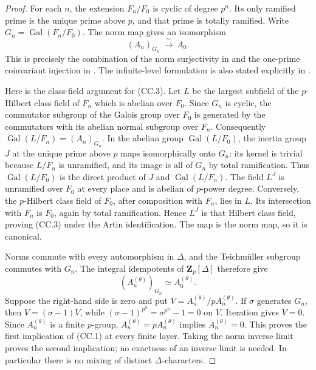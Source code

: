 \begin{proof}
For each $n$, the extension $F_n/F_0$ is cyclic of degree $p^n$.
Its only ramified prime is the unique prime above $p$, and that
prime is totally ramified. Write $G_n=\operatorname{Gal}(F_n/F_0)$.
The norm map gives an isomorphism
\[
                 (A_n)_{G_n}\ \xrightarrow{\ \sim\ }\ A_0.
 \tag{CC.3}
\]
This is precisely the combination of the norm surjectivity in
\cite[Corollary~1.3.9, p.~17]{SharifiIwasawaFull2026} and the
one-prime coinvariant injection in
\cite[Corollary~1.3.12, p.~18]{SharifiIwasawaFull2026}.
The infinite-level formulation is also stated explicitly in
\cite[Proposition~3.2.11, equation~(3.2.1), pp.~80--81;
Remark~3.2.12, p.~81]{SharifiIwasawaFull2026}.

Here is the class-field argument for (CC.3). Let $L$ be the largest
subfield of the $p$-Hilbert class field of $F_n$ which is abelian
over $F_0$. Since $G_n$ is cyclic, the commutator subgroup of the
Galois group over $F_0$ is generated by the commutators with its
abelian normal subgroup over $F_n$. Consequently
$\operatorname{Gal}(L/F_n)=(A_n)_{G_n}$.
In the abelian group $\operatorname{Gal}(L/F_0)$, the inertia
group $J$ at the unique prime above $p$ maps isomorphically onto
$G_n$: its kernel is trivial because $L/F_n$ is unramified, and
its image is all of $G_n$ by total ramification. Thus
$\operatorname{Gal}(L/F_0)$ is the direct product of $J$ and
$\operatorname{Gal}(L/F_n)$. The field $L^J$ is unramified over
$F_0$ at every place and is abelian of $p$-power degree. Conversely,
the $p$-Hilbert class field of $F_0$, after composition with $F_n$,
lies in $L$. Its intersection with $F_n$ is $F_0$, again by total
ramification. Hence $L^J$ is that Hilbert class field, proving
(CC.3) under the Artin identification. The map is the norm map,
so it is canonical.

Norms commute with every automorphism in $\Delta$, and the
Teichm\"uller subgroup commutes with $G_n$. The integral
idempotents of $\mathbf Z_p[\Delta]$ therefore give
\[
 (A_n^{(\theta)})_{G_n}\simeq A_0^{(\theta)}.
\]
Suppose the right-hand side is zero and put
$V=A_n^{(\theta)}/pA_n^{(\theta)}$. If $\sigma$ generates $G_n$,
then $V=(\sigma-1)V$, while
$(\sigma-1)^{p^n}=\sigma^{p^n}-1=0$ on $V$.
Iteration gives $V=0$. Since $A_n^{(\theta)}$ is a finite
$p$-group, $A_n^{(\theta)}=pA_n^{(\theta)}$ implies
$A_n^{(\theta)}=0$. This proves the first implication of (CC.1)
at every finite layer. Taking the norm inverse limit proves the
second implication; no exactness of an inverse limit is needed.
In particular there is no mixing of distinct $\Delta$-characters.


\end{proof}
